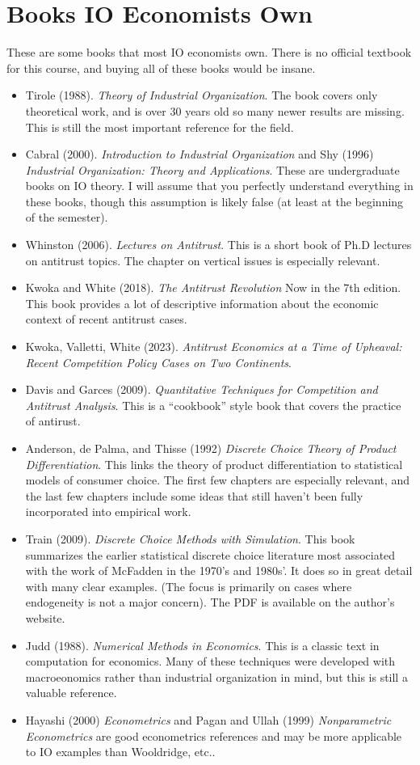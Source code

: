 \documentclass[11pt]{article}
\begin{document}
\section*{Books IO Economists Own}
These are some books that most IO economists own. There is no official textbook for this course, and buying all of these books would be insane.
\begin{itemize}
\item Tirole (1988). \textit{Theory of Industrial Organization}. The book covers only theoretical work, and is over 30 years old so many newer results are missing. This is still the most important reference for the field.
\item Cabral (2000). \textit{Introduction to Industrial Organization} and Shy (1996) \textit{Industrial Organization: Theory and Applications}. These are undergraduate books on IO theory. I will assume that you perfectly understand everything in these books, though this assumption is likely false (at least at the beginning of the semester).
\item Whinston (2006). \textit{Lectures on Antitrust}. This is a short book of Ph.D lectures on antitrust topics. The chapter on vertical issues is especially relevant.
\item Kwoka and White (2018). \textit{The Antitrust Revolution} Now in the 7th edition. This book provides a lot of descriptive information about the economic context of recent antitrust cases.
\item Kwoka, Valletti, White (2023). \textit{Antitrust Economics at a Time of Upheaval: Recent Competition Policy Cases on Two Continents}. 

\item Davis and Garces (2009). \textit{Quantitative Techniques for Competition and Antitrust Analysis}. This is a ``cookbook'' style book that covers the practice of antirust.
\item Anderson, de Palma, and Thisse (1992) \textit{Discrete Choice Theory of Product Differentiation}. This links the theory of product differentiation to statistical models of consumer choice. The first few chapters are especially relevant, and the last few chapters include some ideas that still haven't been fully incorporated into empirical work.
\item Train (2009). \textit{Discrete Choice Methods with Simulation}. This book summarizes the earlier statistical discrete choice literature most associated with the work of McFadden in the 1970's and 1980s'. It does so in great detail with many clear examples. (The focus is primarily on cases where endogeneity is not a major concern). The PDF is available on the author's website.
\item Judd (1988). \textit{Numerical Methods in Economics}. This is a classic text in computation for economics. Many of these techniques were developed with macroeonomics rather than industrial organization in mind, but this is still a valuable reference.
\item Hayashi (2000) \textit{Econometrics} and Pagan and Ullah (1999) \textit{Nonparametric Econometrics} are good econometrics references and may be more applicable to IO examples than Wooldridge, etc.. 
\end{itemize} 
\end{document}
